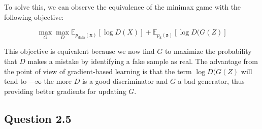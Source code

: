 \documentclass{article}
\begin{document}
To solve this, we can observe the equivalence of the minimax game with the following objective:

\begin{equation}
\max_G \max_D \mathbb{E}_{p_{\text{data}}(\mathbf{x})}[\log D(X)] + \mathbb{E}_{p_{\mathbf{z}}(\mathbf{z})}[\log D(G(Z)]
\end{equation}

This objective is equivalent because we now find $G$ to maximize the probability that $D$ makes a mistake by identifying a fake sample as real. The advantage from the point of view of gradient-based learning is that the term $\log D(G(Z)$ will tend to $-\infty$ the more $D$ is a good discriminator and $G$ a bad generator, thus providing better gradients for updating $G$.

\subsection*{Question 2.5}
\end{document}
